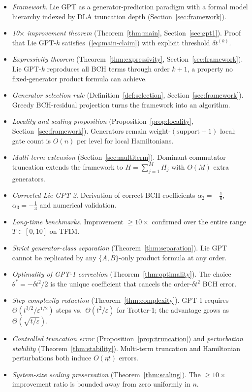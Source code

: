 \documentclass[aps,prxquantum,twocolumn,nofootinbib]{revtex4-2}
\begin{document}
\begin{itemize}
  \item \emph{Framework.} Lie GPT as a generator-prediction paradigm
    with a formal model hierarchy indexed by DLA truncation depth
    (Section~\ref{sec:framework}).
  \item \emph{10$\times$ improvement theorem}
    (Theorem~\ref{thm:main}, Section~\ref{sec:gpt1}).
    Proof that Lie GPT-$k$ satisfies~(\ref{eq:main-claim}) with explicit
    threshold $\delta t^{(k)}$.
  \item \emph{Expressivity theorem}
    (Theorem~\ref{thm:expressivity}, Section~\ref{sec:framework}).
    Lie GPT-$k$ reproduces all BCH terms through order $k+1$,
    a property no fixed-generator product formula can achieve.
  \item \emph{Generator selection rule}
    (Definition~\ref{def:selection}, Section~\ref{sec:framework}).
    Greedy BCH-residual projection turns the framework into an algorithm.
  \item \emph{Locality and scaling proposition}
    (Proposition~\ref{prop:locality}, Section~\ref{sec:framework}).
    Generators remain weight-$(\text{support}+1)$ local;
    gate count is $O(n)$ per level for local Hamiltonians.
  \item \emph{Multi-term extension}
    (Section~\ref{sec:multiterm}).
    Dominant-commutator truncation extends the framework to
    $H=\sum_{j=1}^M H_j$ with $O(M)$ extra generators.
  \item \emph{Corrected Lie GPT-2.} Derivation of correct BCH
    coefficients $\alpha_2=-\tfrac{1}{6}$,
    $\alpha_3=-\tfrac{1}{3}$ and numerical validation.
  \item \emph{Long-time benchmarks.} Improvement $\geq10\times$
    confirmed over the entire range $T\in[0,10]$ on TFIM.
  \item \emph{Strict generator-class separation}
    (Theorem~\ref{thm:separation}).  Lie GPT cannot be replicated by
    any $\{A,B\}$-only product formula at any order.
  \item \emph{Optimality of GPT-1 correction}
    (Theorem~\ref{thm:optimality}).  The choice $\theta^*=-\delta t^2/2$
    is the unique coefficient that cancels the order-$\delta t^2$ BCH error.
  \item \emph{Step-complexity reduction}
    (Theorem~\ref{thm:complexity}).  GPT-1 requires
    $\Theta(t^{3/2}/\varepsilon^{1/2})$ steps vs.\ $\Theta(t^2/\varepsilon)$
    for Trotter-1; the advantage grows as $\Theta(\sqrt{t/\varepsilon})$.
  \item \emph{Controlled truncation error}
    (Proposition~\ref{prop:truncation}) and
    \emph{perturbation stability}
    (Theorem~\ref{thm:stability}).  Multi-term truncation and
    Hamiltonian perturbations both induce $O(\eta t)$ errors.
  \item \emph{System-size scaling preservation}
    (Theorem~\ref{thm:scaling}).  The $\geq10\times$ improvement
    ratio is bounded away from zero uniformly in $n$.
\end{itemize}
\end{document}
